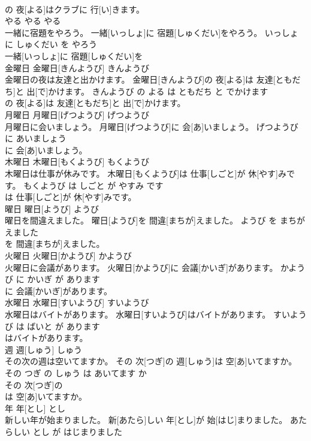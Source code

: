\documentclass[8pt]{extreport}
\begin{document}
\begin{CJK}{UTF8}{min}
\\	の 夜[よる]はクラブに 行[い]きます。		
\\	やる	やる	やる	
\\	一緒に宿題をやろう。	一緒[いっしょ]に 宿題[しゅくだい]をやろう。	いっしょ に しゅくだい を やろう	
\\	一緒[いっしょ]に 宿題[しゅくだい]を
\\	金曜日	金曜日[きんようび]	きんようび	
\\	金曜日の夜は友達と出かけます。	金曜日[きんようび]の 夜[よる]は 友達[ともだち]と 出[で]かけます。	きんようび の よる は ともだち と でかけます	
\\	の 夜[よる]は 友達[ともだち]と 出[で]かけます。		
\\	月曜日	月曜日[げつようび]	げつようび	
\\	月曜日に会いましょう。	月曜日[げつようび]に 会[あ]いましょう。	げつようび に あいましょう	
\\	に 会[あ]いましょう。		
\\	木曜日	木曜日[もくようび]	もくようび	
\\	木曜日は仕事が休みです。	木曜日[もくようび]は 仕事[しごと]が 休[やす]みです。	もくようび は しごと が やすみ です	
\\	は 仕事[しごと]が 休[やす]みです。		
\\	曜日	曜日[ようび]	ようび	
\\	曜日を間違えました。	曜日[ようび]を 間違[まちが]えました。	ようび を まちがえました	
\\	を 間違[まちが]えました。		
\\	火曜日	火曜日[かようび]	かようび	
\\	火曜日に会議があります。	火曜日[かようび]に 会議[かいぎ]があります。	かようび に かいぎ が あります	
\\	に 会議[かいぎ]があります。		
\\	水曜日	水曜日[すいようび]	すいようび	
\\	水曜日はバイトがあります。	水曜日[すいようび]はバイトがあります。	すいようび は ばいと が あります	
\\	はバイトがあります。		
\\	週	週[しゅう]	しゅう	
\\	その次の週は空いてますか。	その 次[つぎ]の 週[しゅう]は 空[あ]いてますか。	その つぎ の しゅう は あいてます か	
\\	その 次[つぎ]の
\\	は 空[あ]いてますか。		
\\	年	年[とし]	とし	
\\	新しい年が始まりました。	新[あたら]しい 年[とし]が 始[はじ]まりました。	あたらしい とし が はじまりました	

\end{CJK}
\end{document}
